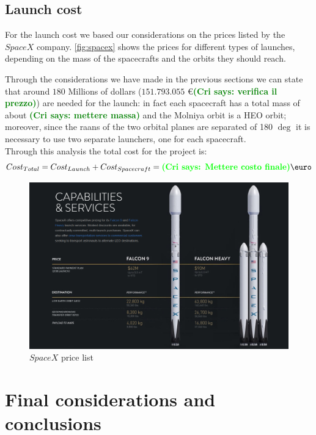 \documentclass[11pt,a4paper,titlepage]{article}
\newcommand{\cri}[1]{\textcolor{green}{\textbf{(Cri says: #1)}}}
\begin{document}
	\subsection{Launch cost}
For the launch cost we based our considerations on the prices listed by the $SpaceX$ company. \autoref{fig:spacex} shows the prices for different types of launches, depending on the mass of the spacecrafts and the orbits they should reach.

Through the considerations we have made in the previous sections we can state that around $180$ Millions of dollars ($151.793.055$ \euro \cri{verifica il prezzo}) are needed for the launch: in fact each spacecraft has a total mass of about \cri{mettere massa} and the Molniya orbit is a HEO orbit; moreover, since the raans of the two orbital planes are separated of 180 $\deg$ it is necessary to use two separate launchers, one for each spacecraft.\\

Through this analysis the total cost for the project is:
\begin{equation}
Cost_{Total} = Cost_{Launch} + Cost_{Spacecraft} = \cri{Mettere costo finale} \text{\euro}
\end{equation}

\begin{figure}
\centering
\includegraphics[width = .9\textwidth]{Spacex.png}
\caption{$SpaceX$ price list}
\label{fig:spacex}
\end{figure}

\section{Final considerations and conclusions}
	\lipsum[1]
\end{document}
